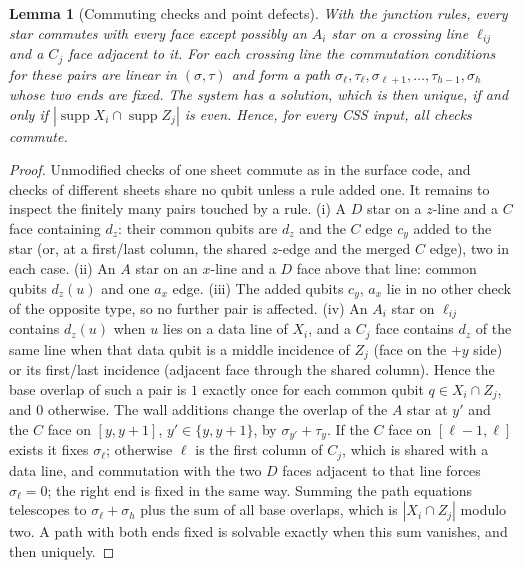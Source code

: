 \documentclass[aps,prx,reprint,superscriptaddress,nofootinbib,floatfix,longbibliography]{revtex4-2}
\newtheorem{lemma}[theorem]{Lemma}
\theoremstyle{definition}
\begin{document}
\begin{lemma}[Commuting checks and point defects]
\label{lem:explicit-commute}
With the junction rules, every star commutes with every face except possibly
an $A_i$ star on a crossing line $\ell_{ij}$ and a $C_j$ face adjacent to it.
For each crossing line the commutation conditions for these pairs are linear
in $(\sigma,\tau)$ and form a path
$\sigma_\ell,\tau_\ell,\sigma_{\ell+1},\dots,\tau_{h-1},\sigma_h$ whose two ends
are fixed.  The system has a solution, which is then unique, if and only if
$|\operatorname{supp}X_i\cap\operatorname{supp}Z_j|$ is even.  Hence, for every
CSS input, all checks commute.
\end{lemma}
\begin{proof}
Unmodified checks of one sheet commute as in the surface code, and checks of
different sheets share no qubit unless a rule added one.  It remains to
inspect the finitely many pairs touched by a rule.  (i) A $D$ star on a
$z$-line and a $C$ face containing $d_z$: their common qubits are $d_z$ and
the $C$ edge $c_y$ added to the star (or, at a first/last column, the shared
$z$-edge and the merged $C$ edge), two in each case.  (ii) An $A$ star on an
$x$-line and a $D$ face above that line: common qubits $d_z(u)$ and one
$a_x$ edge.  (iii) The added qubits $c_y$, $a_x$ lie in no other check of the
opposite type, so no further pair is affected.  (iv) An $A_i$ star on
$\ell_{ij}$ contains $d_z(u)$ when $u$ lies on a data line of $X_i$, and a
$C_j$ face contains $d_z$ of the same line when that data qubit is a middle
incidence of $Z_j$ (face on the $+y$ side) or its first/last incidence
(adjacent face through the shared column).  Hence the base overlap of such a
pair is $1$ exactly once for each common qubit $q\in X_i\cap Z_j$, and $0$
otherwise.  The wall additions change the overlap of the $A$ star at $y'$ and
the $C$ face on $[y,y+1]$, $y'\in\{y,y+1\}$, by $\sigma_{y'}+\tau_y$.  If the
$C$ face on $[\ell-1,\ell]$ exists it fixes $\sigma_\ell$; otherwise
$\ell$ is the first column of $C_j$, which is shared with a data line, and
commutation with the two $D$ faces adjacent to that line forces
$\sigma_\ell=0$; the right end is fixed in the same way.  Summing the path
equations telescopes to $\sigma_\ell+\sigma_h$ plus the sum of all base
overlaps, which is $|X_i\cap Z_j|$ modulo two.  A path with both ends fixed is
solvable exactly when this sum vanishes, and then uniquely.
\end{proof}
\end{document}
